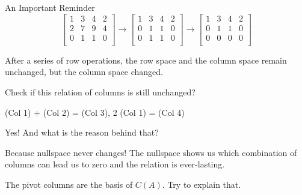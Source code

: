 \documentclass{beamer}
\begin{document}
\begin{frame}{An Important Reminder}
\begin{equation*}
    \left[ \begin{matrix}
        1&		3&		4&		2\\
        2&		7&		9&		4\\
        0&		1&		1&		0\\
    \end{matrix} \right] \rightarrow \left[ \begin{matrix}
        1&		3&		4&		2\\
        0&		1&		1&		0\\
        0&		1&		1&		0\\
    \end{matrix} \right] \rightarrow \left[ \begin{matrix}
        1&		3&		4&		2\\
        0&		1&		1&		0\\
        0&		0&		0&		0\\
    \end{matrix} \right]
\end{equation*}

After a series of row operations, the row space and the column space remain unchanged, but the column space changed.

\vspace{3pt}
Check if this relation of columns is still unchanged?
\begin{center}
    (Col 1) + (Col 2) = (Col 3), 2 (Col 1) = (Col 4)
\end{center}

Yes! And what is the reason behind that?

\vspace{3pt}
Because nullspace never changes! The nullspace shows us which combination of columns can lead us to zero and the relation is ever-lasting.

\vspace{3pt}
The pivot columns are the basis of $C(A)$. Try to explain that.


\end{frame}
\end{document}

